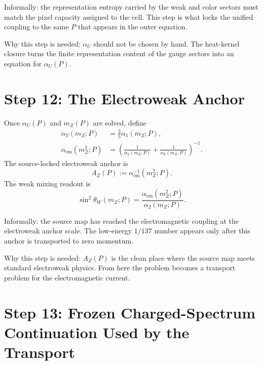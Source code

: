 \documentclass[11pt]{article}
\theoremstyle{remark}
\newcommand{\AZ}{A_Z}
\begin{document}
Informally: the representation entropy carried by the weak and color sectors must match the pixel capacity assigned to the cell. This step is what locks the unified coupling to the same \(P\) that appears in the outer equation.

Why this step is needed: \(\alpha_U\) should not be chosen by hand. The heat-kernel closure turns the finite representation content of the gauge sectors into an equation for \(\alpha_U(P)\).

\section{Step 12: The Electroweak Anchor}

Once \(\alpha_U(P)\) and \(m_Z(P)\) are solved, define
\begin{align}
\alpha_Y(m_Z;P)&=\frac{3}{5}\alpha_1(m_Z;P),\\
\alpha_{\mathrm{em}}(m_Z^2;P)
&=
\left(
\frac{1}{\alpha_2(m_Z;P)}
+\frac{1}{\alpha_Y(m_Z;P)}
\right)^{-1}.
\label{eq:alphaem}
\end{align}
The source-locked electroweak anchor is
\begin{equation}
\boxed{
\AZ(P):=\alpha_{\mathrm{em}}^{-1}(m_Z^2;P).
}
\label{eq:AZ}
\end{equation}
The weak mixing readout is
\begin{equation}
\sin^2\theta_W(m_Z;P)=
\frac{\alpha_{\mathrm{em}}(m_Z^2;P)}{\alpha_2(m_Z;P)}.
\label{eq:sin2}
\end{equation}

Informally: the source map has reached the electromagnetic coupling at the electroweak anchor scale. The low-energy \(1/137\) number appears only after this anchor is transported to zero momentum.

Why this step is needed: \(\AZ(P)\) is the clean place where the source map meets standard electroweak physics. From here the problem becomes a transport problem for the electromagnetic current.

\section{Step 13: Frozen Charged-Spectrum Continuation Used by the Transport}
\end{document}
